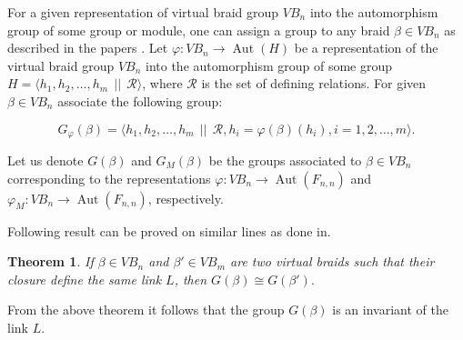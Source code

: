 \documentclass[11 pt, reqno]{amsart}
\newtheorem{theorem}{Theorem}[section]
\theoremstyle{definition}
\numberwithin{equation}{subsection}
\newcommand{\Aut}{\operatorname{Aut}}
\begin{document}
For a given representation of virtual braid group $VB_n$ into the automorphism group of some group or module, one can assign a group to any braid $\beta \in VB_n$ as described in the papers \cite{BB-1, BMN-1}. Let $\varphi:VB_n \to \Aut(H)$ be a representation of the virtual braid group $VB_n$ into the automorphism group of some group $H=\langle h_1,h_2,\ldots, h_m~~||~~\mathcal{R}\rangle$, where $\mathcal{R}$ is the set of defining relations. For given $\beta \in VB_n$ associate the following group:

$$
G_{\varphi}(\beta)=\langle h_1, h_2, \ldots, h_m~~||~~\mathcal{R}, h_i=\varphi(\beta)(h_i), i=1,2,\ldots,m \rangle.
$$
\par
\vspace*{.5cm}
Let us denote $G(\beta)$ and $G_M(\beta)$ be the groups associated to $\beta \in VB_n$ corresponding to the representations $\varphi: VB_n \to \Aut(F_{n,n})$ and $\varphi_M:VB_n \to \Aut(F_{n,n})$, respectively.



Following result can be proved on similar lines as done in\cite[Section 6]{BMN-1}.
\begin{theorem}
If $\beta \in VB_n$ and $\beta' \in VB_m$ are two virtual braids such that their closure define the same link $L$, then $G(\beta) \cong G(\beta').$
\end{theorem}

From the above theorem it follows that the group $G(\beta)$ is an invariant of the link $L$.
\end{document}
